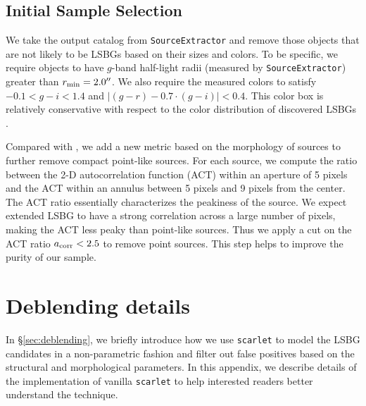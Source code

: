 \documentclass[twocolumn,astrosymb,twocolappendix]{aastex631}
\newcommand{\code}[1]{\texttt{#1}}
\begin{document}
\begin{CJK*}{UTF8}{gbsn}
\subsection{Initial Sample Selection} 
We take the output catalog from \code{SourceExtractor} and remove those objects that are not likely to be LSBGs based on their sizes and colors. To be specific, we require objects to have $g$-band half-light radii (measured by \code{SourceExtractor}) greater than $r_{\rm min} = 2.0\mbox{$^{\prime\prime}$}$. We also require the measured colors to satisfy $-0.1 < g-i < 1.4$ and $|(g-r) - 0.7\cdot (g-i)| < 0.4$. This color box is relatively conservative with respect to the color distribution of discovered LSBGs \citep[e.g.,][]{SAGA-I,Greco2018,Zaritsky2019,Tanoglidis2021}. 

Compared with , we add a new metric based on the morphology of sources to further remove compact point-like sources. For each source, we compute the ratio between the 2-D autocorrelation function (ACT) within an aperture of 5 pixels and the ACT within an annulus between 5 pixels and 9 pixels from the center. The ACT ratio essentially characterizes the peakiness of the source. We expect extended LSBG to have a strong correlation across a large number of pixels, making the ACT less peaky than point-like sources. Thus we apply a cut on the ACT ratio $a_{\rm corr} < 2.5$ to remove point sources. This step helps to improve the purity of our sample.


\section{Deblending details}\label{ap:deblending}
In \S\ref{sec:deblending}, we briefly introduce how we use \code{scarlet} to model the LSBG candidates in a non-parametric fashion and filter out false positives based on the structural and morphological parameters. In this appendix, we describe details of the implementation of vanilla \code{scarlet} to help interested readers better understand the technique.


\end{CJK*}
\end{document}
